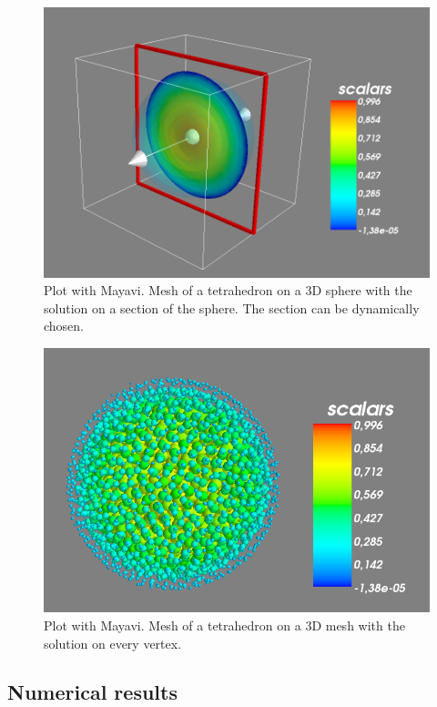 \begin{figure}[!h]
\label{img:matplotlibMesh}
\centering
\includegraphics[scale=0.35]{images/mayavi3D.png}
\caption{Plot with Mayavi. Mesh of a tetrahedron on a $3$D sphere with the solution on a section of the sphere. The section can be dynamically chosen.}
\end{figure}

\begin{figure}[!h]
\label{img:matplotlibMesh}
\centering
\includegraphics[scale=0.4]{images/mayavi3DPoints.png}
\caption{Plot with Mayavi. Mesh of a tetrahedron on a $3$D mesh with the solution on every vertex.}
\end{figure}

\subsection{Numerical results}

